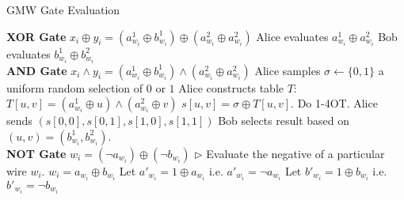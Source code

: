 \begin{algorithm}
\caption{GMW Gate Evaluation}
\label{alg:gmw_gates}
\begin{algorithmic}
    \State \textbf{XOR Gate}
    \Comment $x_i \oplus y_i = (a_{w_i}^1 \oplus b_{w_i}^1) \oplus (a_{w_i}^2 \oplus a_{w_i}^2)$
    \State Alice evaluates $a_{w_i}^1 \oplus a_{w_i}^2$
    \State Bob evaluates $b_{w_i}^1 \oplus b_{w_i}^2$
    \\
    
    \State \textbf{AND Gate}
    \Comment $x_i \wedge y_i = (a_{w_i}^1 \oplus b_{w_i}^1) \wedge (a_{w_i}^2 \oplus a_{w_i}^2)$
    \State Alice samples $\sigma \leftarrow \{0,1\}$
    \Comment a uniform random selection of $0$ or $1$
    \State Alice constructs table $T$:
     	\State $T[u,v] = (a^1_{w_i} \oplus u) \wedge (a^2_{w_i} \oplus v)$
	\State $s[u,v] = \sigma \oplus T[u,v]$.
     \EndFor    
     \State Do 1-4OT. Alice sends $(s[0,0], s[0,1], s[1,0], s[1,1])$ 
     \State Bob selects result based on $(u,v) = (b^1_{w_i}, b^2_{w_i})$.
    \\
    
    \State \textbf{NOT Gate}
    \Comment $w_i = (\neg a_{w_i}) \oplus (\neg b_{w_i})$
    \State $\triangleright$ Evaluate the negative of a particular wire $w_i$. 
    \State $w_i = a_{w_i} \oplus b_{w_i}$
    \State Let $a'_{w_i} = 1 \oplus a_{w_i}$
    \Comment i.e. $a'_{w_i} = \neg a_{w_i}$
    \State Let $b'_{w_i} = 1 \oplus b_{w_i}$
    \Comment i.e. $b'_{w_i} = \neg b_{w_i}$
\end{algorithmic}
\end{algorithm}

